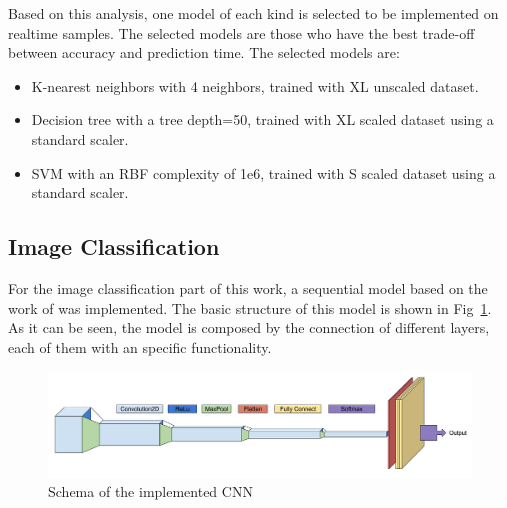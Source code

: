 Based on this analysis, one model of each kind is selected to be implemented on realtime samples. The selected models are those who have the best trade-off between accuracy and prediction time. The selected models are:

\begin{itemize}
    \item K-nearest neighbors with 4 neighbors, trained with XL unscaled dataset.
    \item Decision tree with a tree depth=50, trained with XL scaled dataset using a standard scaler.
    \item \ac{SVM} with an RBF complexity of 1e6, trained with S  scaled dataset using a standard scaler.
\end{itemize}


\subsection{Image Classification}
For the image classification part of this work, a sequential model based on the work of \cite{Paisana2017} was implemented. The basic structure of this model is shown in Fig~\ref{fig:cnn}. As it can be seen, the model is composed by the connection of different layers, each of them with an specific functionality.

\begin{figure}[!htb]
    \centering
      \includegraphics[width=\textwidth]{figures/cnn}
      \caption{Schema of the implemented CNN}
      \label{fig:cnn}
\end{figure}

